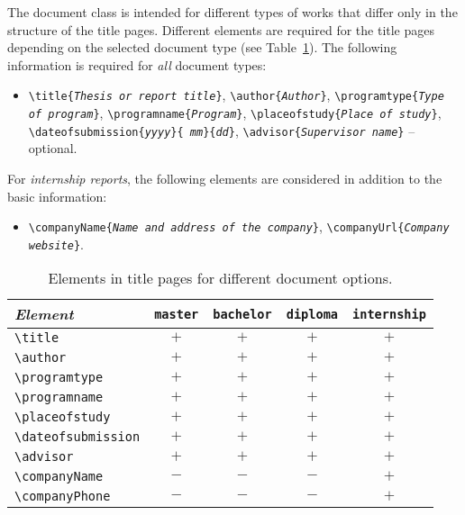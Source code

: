 The document class is intended for different types of works that differ only in
the structure of the title pages. Different elements are required for the title
pages depending on the selected document type (see
Table~\ref{tab:TitleElements}). The following information is required for
\emph{all} document types:
%
\begin{itemize}
    \item[] %
    \verb!\title{!\texttt{\em Thesis or report title}\verb!}!, \newline%
    \verb!\author{!\texttt{\em Author}\verb!}!, \newline%
    \verb!\programtype{!\texttt{\em Type of program}\verb!}!, \newline%
    \verb!\programname{!\texttt{\em Program}\verb!}!, \newline%
    \verb!\placeofstudy{!\texttt{\em Place of study}\verb!}!, \newline%
    \verb!\dateofsubmission{!\texttt{\em yyyy}\verb!}{!\texttt{\em
    mm}\verb!}{!\texttt{\em dd}\verb!}!, \newline%
    \verb!\advisor{!\texttt{\em Supervisor name}\verb!}! --
    optional.
\end{itemize}
%
\noindent
For \emph{internship reports}, the following elements are considered in
addition to the basic information:
%
\begin{itemize}
    \item[] %
    \verb!\companyName{!\texttt{\em Name and address of the company}\verb!}!,
    \newline%
    \verb!\companyUrl{!\texttt{\em Company website}\verb!}!.
\end{itemize}

\begin{table}
    \caption{Elements in title pages for different document options.}
    \label{tab:TitleElements}
    \centering\small
    \begin{tabular}{@{}lcccc@{}}
        \toprule
        \emph{Element} & \texttt{master} & \texttt{bachelor} & 
				\texttt{diploma} & \texttt{internship} \\
        \midrule
        \verb!\title!            & $+$ & $+$ & $+$ & $+$ \\
        \verb!\author!           & $+$ & $+$ & $+$ & $+$ \\
        \verb!\programtype!      & $+$ & $+$ & $+$ & $+$ \\
        \verb!\programname!      & $+$ & $+$ & $+$ & $+$ \\
        \verb!\placeofstudy!     & $+$ & $+$ & $+$ & $+$ \\
        \verb!\dateofsubmission! & $+$ & $+$ & $+$ & $+$ \\
        \verb!\advisor!          & $+$ & $+$ & $+$ & $+$ \\
        \verb!\companyName!      & $-$ & $-$ & $-$ & $+$ \\
        \verb!\companyPhone!     & $-$ & $-$ & $-$ & $+$ \\
        \bottomrule
    \end{tabular}
\end{table}

